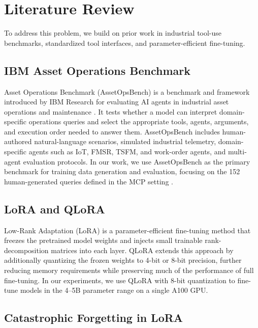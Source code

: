 \documentclass[conference]{IEEEtran}
\begin{document}
\section{Literature Review}

To address this problem, we build on prior work in industrial tool-use benchmarks, standardized tool interfaces, and parameter-efficient fine-tuning.

\subsection{IBM Asset Operations Benchmark}

Asset Operations Benchmark (AssetOpsBench) is a benchmark and framework introduced by IBM Research for evaluating AI agents in industrial asset operations and maintenance \cite{b2}. It tests whether a model can interpret domain-specific operations queries and select the appropriate tools, agents, arguments, and execution order needed to answer them. AssetOpsBench includes human-authored natural-language scenarios, simulated industrial telemetry, domain-specific agents such as IoT, FMSR, TSFM, and work-order agents, and multi-agent evaluation protocols. In our work, we use AssetOpsBench as the primary benchmark for training data generation and evaluation, focusing on the 152 human-generated queries defined in the MCP setting \cite{b1}.

\subsection{LoRA and QLoRA}

Low-Rank Adaptation (LoRA) \cite{b4} is a parameter-efficient fine-tuning method that freezes the pretrained model weights and injects small trainable rank-decomposition matrices into each layer. QLoRA \cite{b3} extends this approach by additionally quantizing the frozen weights to 4-bit or 8-bit precision, further reducing memory requirements while preserving much of the performance of full fine-tuning. In our experiments, we use QLoRA with 8-bit quantization to fine-tune models in the 4--5B parameter range on a single A100 GPU.

\subsection{Catastrophic Forgetting in LoRA}
\end{document}
